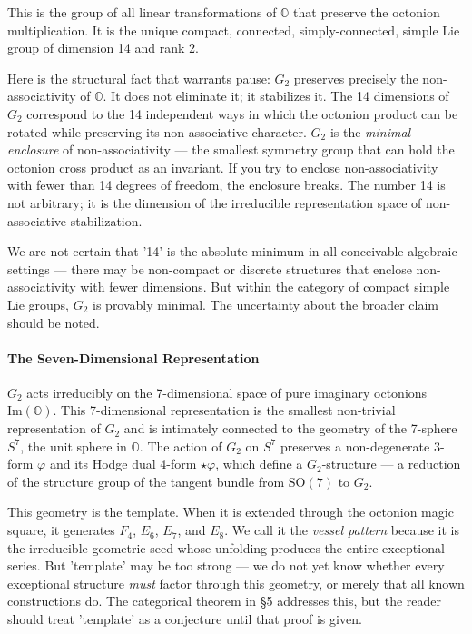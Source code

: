 \documentclass[12pt,a4paper]{article}
\newcommand{\pilcrow}{\S}
\begin{document}
This is the group of all linear transformations of $\mathbb{O}$ that preserve the octonion multiplication. It is the unique compact, connected, simply-connected, simple Lie group of dimension 14 and rank 2.

Here is the structural fact that warrants pause: $G_2$ preserves precisely the non-associativity of $\mathbb{O}$. It does not eliminate it; it stabilizes it. The 14 dimensions of $G_2$ correspond to the 14 independent ways in which the octonion product can be rotated while preserving its non-associative character. $G_2$ is the \emph{minimal enclosure} of non-associativity --- the smallest symmetry group that can hold the octonion cross product as an invariant. If you try to enclose non-associativity with fewer than 14 degrees of freedom, the enclosure breaks. The number 14 is not arbitrary; it is the dimension of the irreducible representation space of non-associative stabilization.

We are not certain that '14' is the absolute minimum in all conceivable algebraic settings --- there may be non-compact or discrete structures that enclose non-associativity with fewer dimensions. But within the category of compact simple Lie groups, $G_2$ is provably minimal. The uncertainty about the broader claim should be noted.

\paragraph{The Seven-Dimensional Representation}

$G_2$ acts irreducibly on the 7-dimensional space of pure imaginary octonions $\text{Im}(\mathbb{O})$. This 7-dimensional representation is the smallest non-trivial representation of $G_2$ and is intimately connected to the geometry of the 7-sphere $S^7$, the unit sphere in $\mathbb{O}$. The action of $G_2$ on $S^7$ preserves a non-degenerate 3-form $\varphi$ and its Hodge dual 4-form $\star\varphi$, which define a $G_2$-structure --- a reduction of the structure group of the tangent bundle from $\text{SO}(7)$ to $G_2$.

This geometry is the template. When it is extended through the octonion magic square, it generates $F_4$, $E_6$, $E_7$, and $E_8$. We call it the \emph{vessel pattern} because it is the irreducible geometric seed whose unfolding produces the entire exceptional series. But 'template' may be too strong --- we do not yet know whether every exceptional structure \emph{must} factor through this geometry, or merely that all known constructions do. The categorical theorem in \pilcrow{}5 addresses this, but the reader should treat 'template' as a conjecture until that proof is given.
\end{document}
